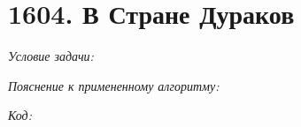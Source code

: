 \section{1604. В Стране Дураков}
\textit{Условие задачи:} \par
\textit{Пояснение к примененному алгоритму:} \par
\textit{Код:}
\small
\begin{center}
    \begin{verbatim}
    \end{verbatim}
\end{center}
\normalsize
\BgThispage
\newpage
